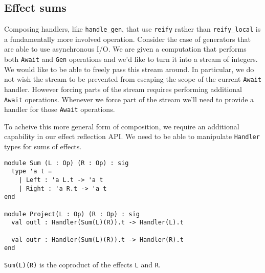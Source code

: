 \documentclass[acmsmall, screen, nonacm]{acmart}
\theoremstyle{definition}
\begin{document}
\subsection{Effect sums}

Composing handlers, like \lstinline[style=ocaml]{handle_gen}, that use
\lstinline[style=ocaml]{reify} rather than
\lstinline[style=ocaml]{reify_local} is a fundamentally more involved
operation. Consider the case of generators that are able to use
asynchronous I/O. We are given a computation that performs both
\lstinline[style=ocaml]{Await} and \lstinline[style=ocaml]{Gen}
operations and we'd like to turn it into a stream of integers.  We would
like to be able to freely pass this stream around. In particular, we do
not wish the stream to be prevented from escaping the scope of the
current \lstinline[style=ocaml]{Await} handler.  However forcing parts
of the stream requires performing additional
\lstinline[style=ocaml]{Await} operations. Whenever we force part of the
stream we'll need to provide a handler for those
\lstinline[style=ocaml]{Await} operations.

To acheive this more general form of composition, we require an
additional capability in our effect reflection API. We need to be able
to manipulate \lstinline[style=ocaml]{Handler} types for sums of
effects.
\begin{lstlisting}[style=ocaml]
module Sum (L : Op) (R : Op) : sig
  type 'a t =
    | Left : 'a L.t -> 'a t
    | Right : 'a R.t -> 'a t
end

module Project(L : Op) (R : Op) : sig
  val outl : Handler(Sum(L)(R)).t -> Handler(L).t

  val outr : Handler(Sum(L)(R)).t -> Handler(R).t
end
\end{lstlisting}

\lstinline[style=ocaml]{Sum(L)(R)} is the coproduct of the effects
\lstinline[style=ocaml]{L} and \lstinline[style=ocaml]{R}.
\end{document}
